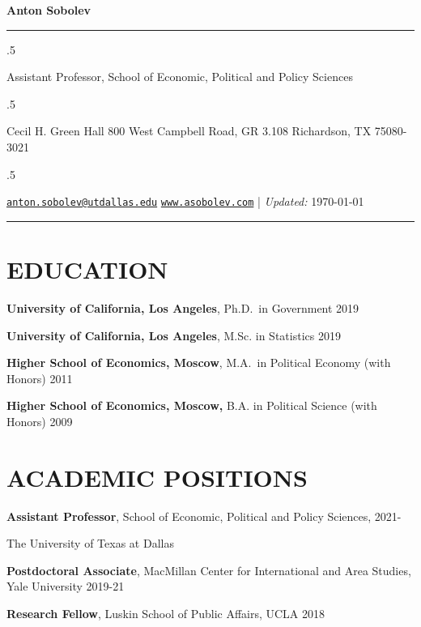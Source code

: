 \documentclass[11pt,]{article}
\begin{document}
\centerline{\huge \bf Anton Sobolev}

\vspace{2 mm}

\hrule

\vspace{2 mm}

\moveleft.5\hoffset\centerline{Assistant Professor, School of Economic,
Political and Policy Sciences}
\moveleft.5\hoffset\centerline{Cecil H. Green Hall \textbar{} 800 West
Campbell Road, GR 3.108 \textbar{} Richardson, TX 75080-3021}
\moveleft.5\hoffset\centerline{ \faEnvelopeO \hspace{1 mm} \href{mailto:}{\tt \href{mailto:anton.sobolev@utdallas.edu}{\nolinkurl{anton.sobolev@utdallas.edu}}} \hspace{1 mm}     \faGlobe \hspace{1 mm} \href{http://www.asobolev.com}{\tt www.asobolev.com}    | \emph{Updated:} \today}

\vspace{2 mm}

\hrule


\hypertarget{education}{%
\section{EDUCATION}\label{education}}

\textbf{University of California, Los Angeles}, Ph.D.~in Government
\hfill 2019

\textbf{University of California, Los Angeles}, M.Sc. in Statistics
\hfill 2019

\textbf{Higher School of Economics, Moscow}, M.A.~in Political Economy
(with Honors) \hfill 2011

\textbf{Higher School of Economics, Moscow,} B.A. in Political Science
(with Honors) \hfill 2009

\hypertarget{academic-positions}{%
\section{ACADEMIC POSITIONS}\label{academic-positions}}

\textbf{Assistant Professor}, School of Economic, Political and Policy
Sciences, \hfill 2021-

The University of Texas at Dallas

\textbf{Postdoctoral Associate}, MacMillan Center for International and
Area Studies, Yale University \hfill 2019-21

\textbf{Research Fellow}, Luskin School of Public Affairs, UCLA
\hfill 2018
\end{document}
